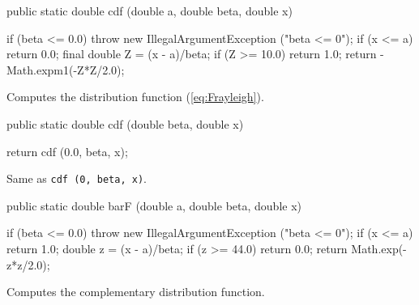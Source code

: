 \begin{code}

   public static double cdf (double a, double beta, double x)\begin{hide} {
      if (beta <= 0.0)
         throw new IllegalArgumentException ("beta <= 0");
      if (x <= a)
         return 0.0;
      final double Z = (x - a)/beta;
      if (Z >= 10.0)
         return 1.0;
      return -Math.expm1(-Z*Z/2.0);
   }\end{hide}
\end{code}
 \begin{tabb}
  Computes the distribution function (\ref{eq:Frayleigh}).
 \end{tabb}
\begin{htmlonly}
\end{htmlonly}
\begin{code}

   public static double cdf (double beta, double x)\begin{hide} {
      return cdf (0.0, beta, x);
   }\end{hide}
\end{code}
\begin{tabb} Same as \texttt{cdf (0, beta, x)}.
\end{tabb}
\begin{htmlonly}
\end{htmlonly}
\begin{code}

   public static double barF (double a, double beta, double x)\begin{hide} {
      if (beta <= 0.0)
         throw new IllegalArgumentException ("beta <= 0");
      if (x <= a)
         return 1.0;
      double z = (x - a)/beta;
      if (z >= 44.0)
         return 0.0;
      return Math.exp(-z*z/2.0);
   }\end{hide}
\end{code}
  \begin{tabb}
 Computes  the complementary distribution function.
 \end{tabb}
\begin{htmlonly}
\end{htmlonly}
